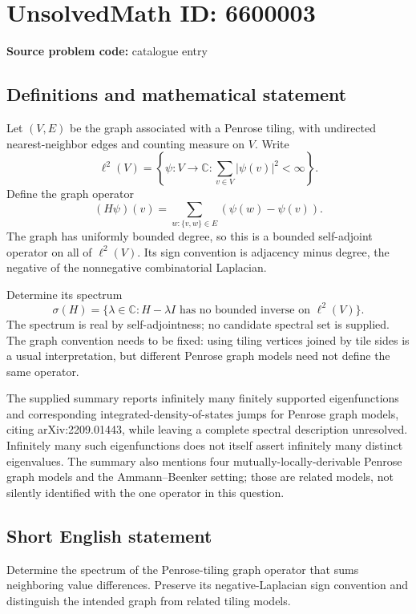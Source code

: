 \documentclass[11pt]{article}
\begin{document}
\section*{UnsolvedMath ID: 6600003}
\textbf{Source problem code:} catalogue entry
\subsection{Definitions and mathematical statement}
Let $(V,E)$ be the graph associated with a Penrose tiling, with undirected nearest-neighbor edges and counting measure on $V$. Write
\[
\ell^2(V)=\left\{\psi:V\to\mathbb C:\sum_{v\in V}|\psi(v)|^2<\infty\right\}.
\]
Define the graph operator
\[
(H\psi)(v)=\sum_{w:\{v,w\}\in E}(\psi(w)-\psi(v)).
\]
The graph has uniformly bounded degree, so this is a bounded self-adjoint operator on all of $\ell^2(V)$. Its sign convention is adjacency minus degree, the negative of the nonnegative combinatorial Laplacian.

Determine its spectrum
\[
\sigma(H)=\{\lambda\in\mathbb C:H-\lambda I\text{ has no bounded inverse on }\ell^2(V)\}.
\]
The spectrum is real by self-adjointness; no candidate spectral set is supplied. The graph convention needs to be fixed: using tiling vertices joined by tile sides is a usual interpretation, but different Penrose graph models need not define the same operator.

The supplied summary reports infinitely many finitely supported eigenfunctions and corresponding integrated-density-of-states jumps for Penrose graph models, citing arXiv:2209.01443, while leaving a complete spectral description unresolved. Infinitely many such eigenfunctions does not itself assert infinitely many distinct eigenvalues. The summary also mentions four mutually-locally-derivable Penrose graph models and the Ammann--Beenker setting; those are related models, not silently identified with the one operator in this question.
\subsection{Short English statement}
Determine the spectrum of the Penrose-tiling graph operator that sums neighboring value differences. Preserve its negative-Laplacian sign convention and distinguish the intended graph from related tiling models.
\end{document}
